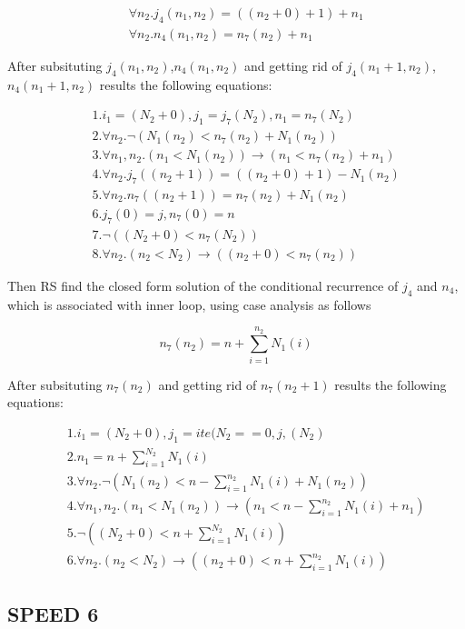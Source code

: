 \begin{eqnarray*}
	&&\forall n_2.j_4(n_1,n_2) = ((n_2+0)+1)+n_1\\  
	&&\forall n_2.n_4(n_1,n_2) = n_7(n_2)+n_1 
\end{eqnarray*}

After subsituting $j_4(n_1,n_2)$,$n_4(n_1,n_2)$ and getting rid of $j_4(n_1+1,n_2)$,$n_4(n_1+1,n_2)$ results the following equations:

\begin{eqnarray*}
	&&1.i_1 = (N_2+0), j_1 = j_7(N_2), n_1 = n_7(N_2)\\
	&&2.\forall n_2.\neg (N_1(n_2)<n_7(n_2)+N_1(n_2))\\
	&&3.\forall n_1,n_2.(n_1<N_1(n_2)) \rightarrow (n_1<n_7(n_2)+n_1)\\
	&&4.\forall n_2.j_7((n_2+1)) = ((n_2+0)+1)-N_1(n_2)\\
	&&5.\forall n_2.n_7((n_2+1)) = n_7(n_2)+N_1(n_2)\\
	&&6.j_7(0) = j, n_7(0) = n\\
	&&7.\neg ((N_2+0)<n_7(N_2))\\
	&&8.\forall n_2.(n_2<N_2) \rightarrow ((n_2+0)<n_7(n_2))
\end{eqnarray*}



Then RS find the closed form solution of the conditional recurrence of $j_4$ and $n_4$, which is associated  with inner loop, using case analysis as follows

\[n_7(n_2) = n+\sum_{i=1}^{n_2}N_1(i)\]

After subsituting $n_7(n_2)$ and getting rid of $n_7(n_2+1)$ results the following equations:

\begin{eqnarray*}
	&&1.i_1 = (N_2+0), j_1 = ite(N_2==0,j,(N_2)\\
	&&2.n_1 = n+\sum_{i=1}^{N_2}N_1(i)\\
	&&3.\forall n_2.\neg (N_1(n_2)<n-\sum_{i=1}^{n_2}N_1(i)+N_1(n_2))\\
	&&4.\forall n_1,n_2.(n_1<N_1(n_2)) \rightarrow (n_1<n-\sum_{i=1}^{n_2}N_1(i)+n_1)\\
	&&5.\neg ((N_2+0)<n+\sum_{i=1}^{N_2}N_1(i))\\
	&&6.\forall n_2.(n_2<N_2) \rightarrow ((n_2+0)<n+\sum_{i=1}^{n_2}N_1(i))
\end{eqnarray*}
\subsection{SPEED 6}

